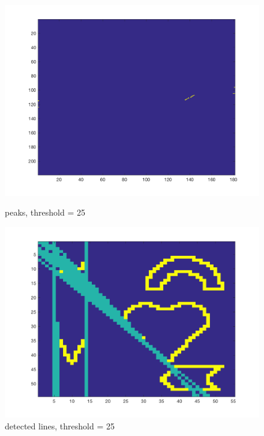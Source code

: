 \documentclass[paper=a4, fontsize=11pt]{scrartcl} %
\numberwithin{equation}{section} %
\numberwithin{figure}{section} %
\numberwithin{table}{section} %
\begin{document}
\begin{figure}[H]
  \centering
  \begin{minipage}[b]{0.49\textwidth}
    \includegraphics[width=\textwidth]{peaks_threshold_25.png}
    \caption{peaks, threshold = 25}
  \end{minipage}
  \hfill
  \begin{minipage}[b]{0.49\textwidth}
    \includegraphics[width=\textwidth]{edgeDetection_threshold_25.png}
    \caption{detected lines, threshold = 25}
  \end{minipage}
\end{figure}
\end{document}
